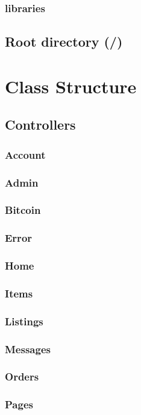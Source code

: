 \documentclass[11pt]{article} %
\begin{document}
\subsubsection*{libraries}
\subsection{Root directory (/)}
\newpage

\section{Class Structure}
\subsection{Controllers}
\subsubsection*{Account}
\subsubsection*{Admin}
\subsubsection*{Bitcoin}
\subsubsection*{Error}
\subsubsection*{Home}
\subsubsection*{Items}
\subsubsection*{Listings}
\subsubsection*{Messages}
\subsubsection*{Orders}
\subsubsection*{Pages}
\end{document}
